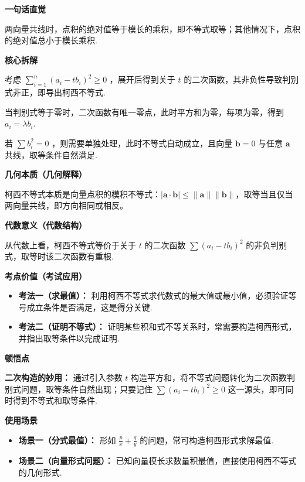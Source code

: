 \begin{explanationbox}
	\textbf{\textcolor{CExplanation}{一句话直觉}}

	两向量共线时，点积的绝对值等于模长的乘积，即不等式取等；其他情况下，点积的绝对值总小于模长乘积.

	\medskip
	\textbf{\textcolor{CExplanation}{核心拆解}}
	\begin{description}[style=nextline, leftmargin=2.8em, labelsep=0.5em, itemsep=0.45em]
		\item[\textbf{要点一（构造二次型）：}] 考虑 $\sum_{i=1}^n (a_i - t b_i)^2 \ge 0$ ，展开后得到关于 $t$ 的二次函数，其非负性导致判别式非正，即导出柯西不等式.
		\item[\textbf{要点二（判别式等于零）：}] 当判别式等于零时，二次函数有唯一零点，此时平方和为零，每项为零，得到 $a_i = \lambda b_i$.
		\item[\textbf{要点三（分类讨论）：}] 若 $\sum b_i^2 = 0$ ，则需要单独处理，此时不等式自动成立，且向量 $\boldsymbol{b}=0$ 与任意 $\boldsymbol{a}$ 共线，取等条件自然满足.
	\end{description}

	\medskip
	\textbf{\textcolor{CExplanation}{几何本质（几何解释）}}

	柯西不等式本质是向量点积的模积不等式：$|\boldsymbol{a}\cdot\boldsymbol{b}| \le \|\boldsymbol{a}\|\|\boldsymbol{b}\|$，取等当且仅当两向量共线，即方向相同或相反。

	\medskip
	\textbf{\textcolor{CExplanation}{代数意义（代数结构）}}

	从代数上看，柯西不等式等价于关于 $t$ 的二次函数 $\sum (a_i - t b_i)^2$ 的非负判别式，取等时该二次函数有重根.

	\medskip
	\textbf{\textcolor{CExplanation}{考点价值（考试应用）}}
	\begin{itemize}[leftmargin=*, itemsep=0.5em, topsep=0.4em]
		\item \textbf{考法一（求最值）：} 利用柯西不等式求代数式的最大值或最小值，必须验证等号成立条件是否满足，这是得分关键.
		\item \textbf{考法二（证明不等式）：} 证明某些积和式不等关系时，常需要构造柯西形式，并指出取等条件以完成证明.
	\end{itemize}

	\medskip
	\textbf{\textcolor{CExplanation}{顿悟点}}

	\textbf{二次构造的妙用：} 通过引入参数 $t$ 构造平方和，将不等式问题转化为二次函数判别式问题，取等条件自然出现；只要记住 $\sum (a_i - t b_i)^2 \ge 0$ 这一源头，即可同时得到不等式和取等条件.

	\medskip
	\textbf{\textcolor{CExplanation}{使用场景}}
	\begin{itemize}[leftmargin=*, itemsep=0.5em, topsep=0.4em]
		\item \textbf{场景一（分式最值）：} 形如 $\frac{p}{x} + \frac{q}{y}$ 的问题，常可构造柯西形式求解最值.
		\item \textbf{场景二（向量形式问题）：} 已知向量模长求数量积最值，直接使用柯西不等式的几何形式.
	\end{itemize}
\end{explanationbox}
